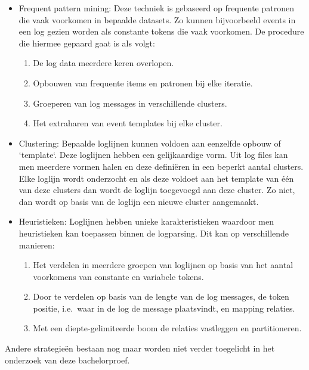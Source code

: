 \begin{itemize}
    \item Frequent pattern mining: Deze techniek is gebaseerd op frequente patronen die vaak voorkomen in bepaalde datasets.
    Zo kunnen bijvoorbeeld events in een log gezien worden als constante tokens die vaak voorkomen. De procedure die hiermee gepaard gaat is als volgt:\\
    \begin{enumerate}
        \item De log data meerdere keren overlopen.
        \item Opbouwen van frequente items en patronen bij elke iteratie.
        \item Groeperen van log messages in verschillende clusters.
        \item Het extraharen van event templates bij elke cluster. 
    \end{enumerate} 
    \item Clustering: Bepaalde loglijnen kunnen voldoen aan eenzelfde opbouw of `template`. Deze loglijnen hebben een gelijkaardige vorm. Uit log files kan men meerdere vormen halen en deze definiëren in een beperkt aantal clusters. Elke loglijn wordt onderzocht en als deze voldoet aan het template van één van deze clusters dan wordt de loglijn toegevoegd aan deze cluster. Zo niet, dan wordt op basis van de loglijn een nieuwe cluster aangemaakt.
    \item Heuristieken: Loglijnen hebben unieke karakteristieken waardoor men heuristieken kan toepassen binnen de logparsing. Dit kan op verschillende manieren:\\
    \begin{enumerate}
        \item Het verdelen in meerdere groepen van loglijnen op basis van het aantal voorkomens van constante en variabele tokens.
        \item Door te verdelen op basis van de lengte van de log messages, de token positie, i.e.\ waar in de log de message plaatsvindt, en mapping relaties.
        \item Met een diepte-gelimiteerde boom de relaties vastleggen en partitioneren.
    \end{enumerate}
\end{itemize}
Andere strategieën bestaan nog maar worden niet verder toegelicht in het onderzoek van deze bachelorproef.


